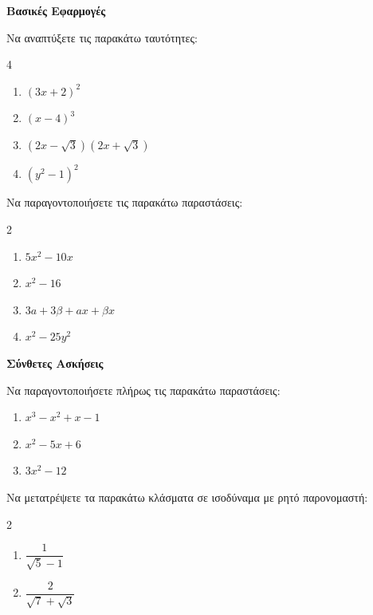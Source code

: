 \documentclass[11pt,a4paper,modern,B]{FFExam}
\begin{document}
\begin{thema}
\item \textbf{Βασικές Εφαρμογές}
\begin{erwthma}
    \item Να αναπτύξετε τις παρακάτω ταυτότητες: 
    \begin{multicols}{4}
    \begin{enumerate}[label=\alph*.]
        \item $(3x+2)^2$
        \item $(x-4)^3$
        \item $(2x-\sqrt{3})(2x+\sqrt{3})$
        \item $(y^2-1)^2$
    \end{enumerate}
    \end{multicols}
    \item Να παραγοντοποιήσετε τις παρακάτω παραστάσεις: 
    \begin{multicols}{2}
    \begin{enumerate}[label=\alph*.]
        \item $5x^2 - 10x$
        \item $x^2 - 16$
        \item $3a + 3\beta + ax + \beta x$
        \item $x^2 - 25y^2$
    \end{enumerate}
    \end{multicols}
\end{erwthma}

\item \textbf{Σύνθετες Ασκήσεις}
\begin{erwthma}
    \item Να παραγοντοποιήσετε πλήρως τις παρακάτω παραστάσεις: 
    \begin{enumerate}[label=\alph*.]
        \item $x^3 - x^2 + x - 1$
        \item $x^2 - 5x + 6$
        \item $3x^2 - 12$
    \end{enumerate}
    \item Να μετατρέψετε τα παρακάτω κλάσματα σε ισοδύναμα με ρητό παρονομαστή: 
    \begin{multicols}{2}
    \begin{enumerate}[label=\alph*.]
        \item $\dfrac{1}{\sqrt{5}-1}$
        \item $\dfrac{2}{\sqrt{7}+\sqrt{3}}$
    \end{enumerate}
    \end{multicols}
\end{erwthma}


\end{thema}
\end{document}
